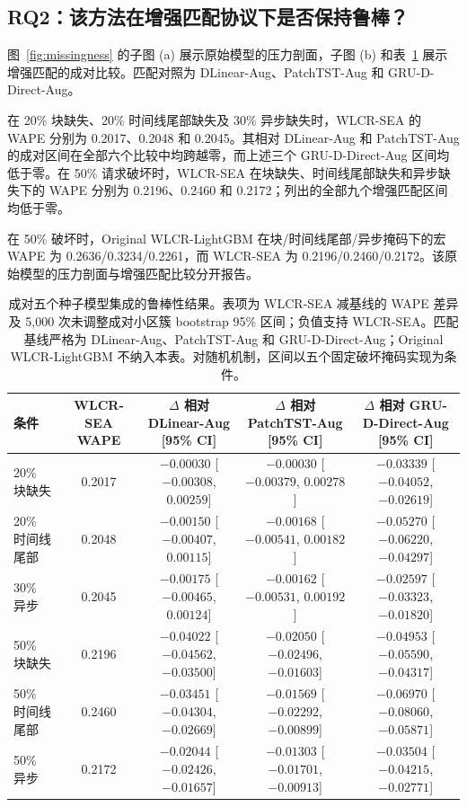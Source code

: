 \documentclass[10pt,conference,letterpaper]{IEEEtran}
\newcommand{\method}{WLCR-SEA}
\newcommand{\originalmethod}{Original WLCR-LightGBM}
\begin{document}
\subsection{RQ2：该方法在增强匹配协议下是否保持鲁棒？}
图~\ref{fig:missingness} 的子图 (a) 展示原始模型的压力剖面，子图 (b) 和表~\ref{tab:robust-ci} 展示增强匹配的成对比较。匹配对照为 DLinear-Aug、PatchTST-Aug 和 GRU-D-Direct-Aug。

在 20\% 块缺失、20\% 时间线尾部缺失及 30\% 异步缺失时，\method{} 的 WAPE 分别为 0.2017、0.2048 和 0.2045。其相对 DLinear-Aug 和 PatchTST-Aug 的成对区间在全部六个比较中均跨越零，而上述三个 GRU-D-Direct-Aug 区间均低于零。在 50\% 请求破坏时，\method{} 在块缺失、时间线尾部缺失和异步缺失下的 WAPE 分别为 0.2196、0.2460 和 0.2172；列出的全部九个增强匹配区间均低于零。

在 50\% 破坏时，\originalmethod{} 在块/时间线尾部/异步掩码下的宏 WAPE 为 0.2636/0.3234/0.2261，而 \method{} 为 0.2196/0.2460/0.2172。该原始模型的压力剖面与增强匹配比较分开报告。

\begin{table}[t]
\centering
\caption{成对五个种子模型集成的鲁棒性结果。表项为 \method{} 减基线的 WAPE 差异及 5,000 次未调整成对小区簇 bootstrap 95\% 区间；负值支持 \method{}。匹配基线严格为 DLinear-Aug、PatchTST-Aug 和 GRU-D-Direct-Aug；\originalmethod{} 不纳入本表。对随机机制，区间以五个固定破坏掩码实现为条件。}
\label{tab:robust-ci}
\footnotesize
\setlength{\tabcolsep}{3.0pt}
\begin{tabular}{lcccc}
\toprule
条件 & \method{} WAPE & \shortstack{$\Delta$ 相对\\DLinear-Aug [95\% CI]} & \shortstack{$\Delta$ 相对\\PatchTST-Aug [95\% CI]} & \shortstack{$\Delta$ 相对\\GRU-D-Direct-Aug [95\% CI]}\\
\midrule
20\% 块缺失 & 0.2017 & $-0.00030$ [$-0.00308$, $0.00259$] & $-0.00030$ [$-0.00379$, $0.00278$] & $-0.03339$ [$-0.04052$, $-0.02619$]\\
20\% 时间线尾部 & 0.2048 & $-0.00150$ [$-0.00407$, $0.00115$] & $-0.00168$ [$-0.00541$, $0.00182$] & $-0.05270$ [$-0.06220$, $-0.04297$]\\
30\% 异步 & 0.2045 & $-0.00175$ [$-0.00465$, $0.00124$] & $-0.00162$ [$-0.00531$, $0.00192$] & $-0.02597$ [$-0.03323$, $-0.01820$]\\
50\% 块缺失 & 0.2196 & $-0.04022$ [$-0.04562$, $-0.03500$] & $-0.02050$ [$-0.02496$, $-0.01603$] & $-0.04953$ [$-0.05590$, $-0.04317$]\\
50\% 时间线尾部 & 0.2460 & $-0.03451$ [$-0.04304$, $-0.02669$] & $-0.01569$ [$-0.02292$, $-0.00899$] & $-0.06970$ [$-0.08060$, $-0.05871$]\\
50\% 异步 & 0.2172 & $-0.02044$ [$-0.02426$, $-0.01657$] & $-0.01303$ [$-0.01701$, $-0.00913$] & $-0.03504$ [$-0.04215$, $-0.02771$]\\
\bottomrule
\end{tabular}
\end{table}
\end{document}
